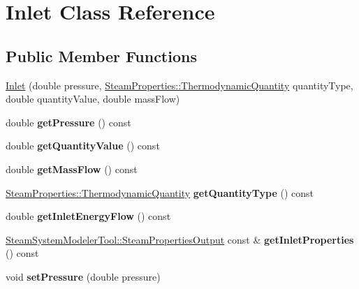 \hypertarget{class_inlet}{}\section{Inlet Class Reference}
\label{class_inlet}
\subsection*{Public Member Functions}
\begin{DoxyCompactItemize}
\item 
\hyperlink{class_inlet_a1b0e1d27b8c7b11cfd96623b1c0b8a9e}{Inlet} (double pressure, \hyperlink{class_steam_properties_ae0294bedf7d178c2d8fb6aed0f62fbff}{Steam\+Properties\+::\+Thermodynamic\+Quantity} quantity\+Type, double quantity\+Value, double mass\+Flow)
\item 
\mbox{\label{class_inlet_af9bc455eb1287892901b7d090dabddfd}} 
double {\bfseries get\+Pressure} () const
\item 
\mbox{\label{class_inlet_ac9279e9c81b989b795351f09c4dd2b71}} 
double {\bfseries get\+Quantity\+Value} () const
\item 
\mbox{\label{class_inlet_af32941228d08175cb13d6f7757de39aa}} 
double {\bfseries get\+Mass\+Flow} () const
\item 
\mbox{\label{class_inlet_a3ed1699b174d0698af937c7146bbee79}} 
\hyperlink{class_steam_properties_ae0294bedf7d178c2d8fb6aed0f62fbff}{Steam\+Properties\+::\+Thermodynamic\+Quantity} {\bfseries get\+Quantity\+Type} () const
\item 
\mbox{\label{class_inlet_a870b939e6b0de093a42341e3fa22d75b}} 
double {\bfseries get\+Inlet\+Energy\+Flow} () const
\item 
\mbox{\label{class_inlet_a6f2f7f2569a5815c60c728d6930b59af}} 
\hyperlink{struct_steam_system_modeler_tool_1_1_steam_properties_output}{Steam\+System\+Modeler\+Tool\+::\+Steam\+Properties\+Output} const  \& {\bfseries get\+Inlet\+Properties} () const
\item 
\mbox{\label{class_inlet_ad0d848976347160293c6576e005f090b}} 
void {\bfseries set\+Pressure} (double pressure)
\item 

\end{DoxyCompactItemize}
